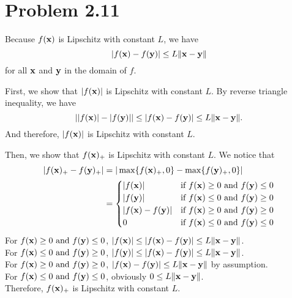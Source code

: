 \documentclass{scrartcl}
\begin{document}
\section*{Problem 2.11}

Because $f(\mathbf{x})$ is Lipschitz with constant $L$, we have
\begin{equation}
	|f(\mathbf{x}) - f(\mathbf{y})| \le L \|\mathbf{x}-\mathbf{y}\|
	\label{eqn:lip_ineq}
\end{equation}
for all $\mathbf{x}$ and $\mathbf{y}$ in the domain of $f$.

First, we show that $|f(\mathbf{x})|$ is Lipschitz with constant $L$.
By reverse triangle inequality, we have
\begin{equation}
	||f(\mathbf{x})|-|f(\mathbf{y})|| \le |f(\mathbf{x})-f(\mathbf{y})| \le L \|\mathbf{x}-\mathbf{y}\| .
\end{equation}
And therefore, $|f(\mathbf{x})|$ is Lipschitz with constant $L$.

Then, we show that $f(\mathbf{x})_+$ is Lipschitz with constant $L$.
We notice that
\begin{equation}
	\begin{split}
	|f(\mathbf{x})_+-f(\mathbf{y})_+|
	& = |\max\{f(\mathbf{x})_+,0\}-\max\{f(\mathbf{y})_+,0\}| \\
	& =
	\begin{cases}
    		|f(\mathbf{x})|  &  \text{if } f(\mathbf{x}) \ge 0 \text{ and } f(\mathbf{y}) \le 0 \\
		|f(\mathbf{y})|  &  \text{if } f(\mathbf{x}) \le 0 \text{ and } f(\mathbf{y}) \ge 0 \\    		
    		|f(\mathbf{x})-f(\mathbf{y})| & \text{if } f(\mathbf{x}) \ge 0 \text{ and } f(\mathbf{y}) \ge 0 \\
    		0 & \text{if } f(\mathbf{x}) \le 0 \text{ and } f(\mathbf{y}) \le 0
	\end{cases}
	\end{split}
\end{equation}
For $f(\mathbf{x}) \ge 0 \text{ and } f(\mathbf{y}) \le 0$,
$|f(\mathbf{x})| \le |f(\mathbf{x})-f(\mathbf{y})| \le L \|\mathbf{x}-\mathbf{y}\|$. \\
For $f(\mathbf{x}) \le 0 \text{ and } f(\mathbf{y}) \ge 0$,
$|f(\mathbf{y})| \le |f(\mathbf{x})-f(\mathbf{y})| \le L \|\mathbf{x}-\mathbf{y}\|$. \\
For $f(\mathbf{x}) \ge 0 \text{ and } f(\mathbf{y}) \ge 0$,
$|f(\mathbf{x})-f(\mathbf{y})| \le L \|\mathbf{x}-\mathbf{y}\|$
by assumption. \\
For $f(\mathbf{x}) \le 0 \text{ and } f(\mathbf{y}) \le 0$,
obviously $0 \le L \|\mathbf{x}-\mathbf{y}\|$. \\
Therefore, $f(\mathbf{x})_+$ is Lipschitz with constant $L$.
\end{document}
